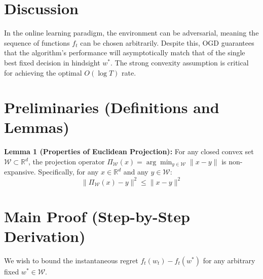 \documentclass[12pt]{article}
\begin{document}
\section*{Discussion}
In the online learning paradigm, the environment can be adversarial, meaning the sequence of functions $f_t$ can be chosen arbitrarily. Despite this, OGD guarantees that the algorithm's performance will asymptotically match that of the single best fixed decision in hindsight $w^*$. The strong convexity assumption is critical for achieving the optimal $O(\log T)$ rate.

\section*{Preliminaries (Definitions and Lemmas)}
\textbf{Lemma 1 (Properties of Euclidean Projection):} For any closed convex set $\mathcal{W} \subset \mathbb{R}^d$, the projection operator $\Pi_{\mathcal{W}}(x) = \arg\min_{y \in \mathcal{W}} \|x - y\|$ is non-expansive. Specifically, for any $x \in \mathbb{R}^d$ and any $y \in \mathcal{W}$:
$$\|\Pi_{\mathcal{W}}(x) - y\|^2 \leq \|x - y\|^2$$

\section*{Main Proof (Step-by-Step Derivation)}
We wish to bound the instantaneous regret $f_t(w_t) - f_t(w^*)$ for any arbitrary fixed $w^* \in \mathcal{W}$.
\end{document}
